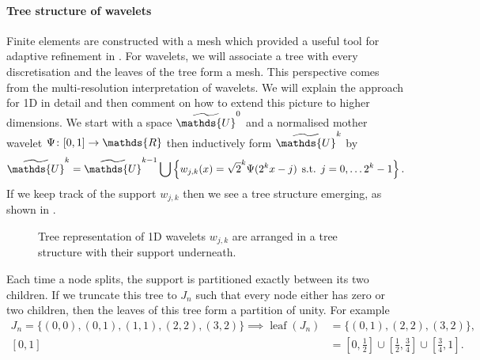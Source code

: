 \documentclass[10pt,a4paper,onecolumn]{article}
\numberwithin{equation}{section}
\let\F\mathds\let\C\mathcal\newcommand{\R}{\F{R}}\newcommand{\A}{\C{A}}
\newcommand{\op}[1]{\operatorname{#1}}\newcommand{\overtext}[2]{\stackrel{\text{#1}}{#2}}
\DeclareMathOperator{\st}{\;s.t.\;}\DeclareMathOperator{\as}{\;a.s.\;}\renewcommand{\epsilon}{\varepsilon}
\newcommand*{\spcf}[1]{%
	\IfEqCase{#1}{%
		{0}{\F{U}}%
		{1}{\F{V}}%
		{2}{\F{W}}%
	}[\F{U}#1]%
}
\newcommand*{\vard}[1]{%
	\IfEqCase{#1}{%
		{0}{\varphi}%
		{1}{\psi}%
	}[\varphi #1]%
}
\newcommand*{\varx}[1]{%
	\IfEqCase{#1}{%
		{0}{x}%
		{1}{y}%
		{2}{z}%
		{3}{r}%
	}[x#1]%
}
\begin{document}
\paragraph{Tree structure of wavelets}
Finite elements are constructed with a mesh which provided a useful tool for adaptive refinement in . For wavelets, we will associate a tree with every discretisation and the leaves of the tree form a mesh. This perspective comes from the multi-resolution interpretation of wavelets. We will explain the approach for 1D in detail and then comment on how to extend this picture to higher dimensions. We start with a space $\tilde{\spcf0}^0$ and a normalised mother wavelet $\vard1\colon[0,1]\to \R$ then inductively form $\tilde{\spcf0}^k$ by
$$\tilde{\spcf0}^k = \tilde{\spcf0}^{k-1}\bigcup\left\{w_{j,k}(\varx0) = \sqrt{2}^k\vard1(2^{k}\varx0-j)\st j=0,\ldots 2^k-1\right\}.$$
If we keep track of the support $w_{j,k}$ then we see a tree structure emerging, as shown in .
\begin{figure}\begin{center}\end{center}
	\caption{Tree representation of 1D wavelets $w_{j,k}$ are arranged in a tree structure with their support underneath.}\label{fig:ca: wavelet tree}
\end{figure}
Each time a node splits, the support is partitioned exactly between its two children. If we truncate this tree to $J_n$ such that every node either has zero or two children, then the leaves of this tree form a partition of unity. For example
\begin{align*}
	J_n = \{(0,0), (0,1),(1,1), (2,2), (3,2)\} \implies \op{leaf}(J_n) &= \{(0,1), (2,2), (3,2)\}, 
	\\ [0,1] &= [0,\tfrac12]\cup[\tfrac12,\tfrac34]\cup[\tfrac34,1].
\end{align*}
\end{document}
